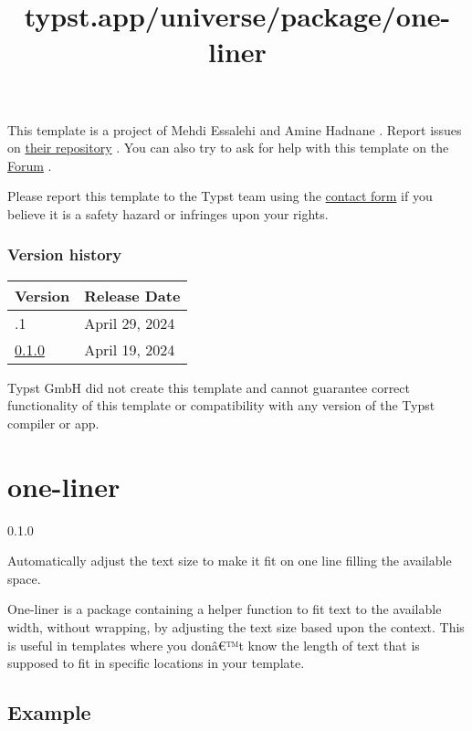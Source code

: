 This template is a project of Mehdi Essalehi and Amine Hadnane . Report
issues on
\href{https://github.com/essmehdi/ensias-report-template}{their
repository} . You can also try to ask for help with this template on the
\href{https://forum.typst.app}{Forum} .

Please report this template to the Typst team using the
\href{https://typst.app/contact}{contact form} if you believe it is a
safety hazard or infringes upon your rights.

\label{versions}
\subsubsection{Version history}\label{version-history}

\begin{longtable}[]{@{}ll@{}}
\toprule\noalign{}
Version & Release Date \\
\midrule\noalign{}
\endhead
\bottomrule\noalign{}
\endlastfoot
0.1.1 & April 29, 2024 \\
\href{https://typst.app/universe/package/red-agora/0.1.0/}{0.1.0} &
April 19, 2024 \\
\end{longtable}

Typst GmbH did not create this template and cannot guarantee correct
functionality of this template or compatibility with any version of the
Typst compiler or app.


\title{typst.app/universe/package/one-liner}

\label{banner}
\section{one-liner}\label{one-liner}

{ 0.1.0 }

Automatically adjust the text size to make it fit on one line filling
the available space.

\label{readme}
One-liner is a package containing a helper function to fit text to the
available width, without wrapping, by adjusting the text size based upon
the context. This is useful in templates where you donâ€™t know the
length of text that is supposed to fit in specific locations in your
template.

\subsection{Example}\label{example}

